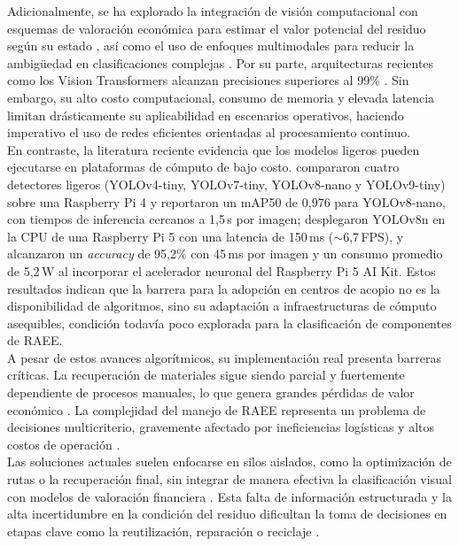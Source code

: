 Adicionalmente, se ha explorado la integración de visión computacional con esquemas de valoración económica para estimar el valor potencial del residuo según su estado \cite{joshiSustainableEWasteManagement2024}, así como el uso de enfoques multimodales para reducir la ambigüedad en clasificaciones complejas \cite{obayemiAutomatedWEEESortation2025a}. Por su parte, arquitecturas recientes como los Vision Transformers alcanzan precisiones superiores al 99\% \cite{chauhanViT4WasteVisionTransformerBased2025}. Sin embargo, su alto costo computacional, consumo de memoria y elevada latencia limitan drásticamente su aplicabilidad en escenarios operativos, haciendo imperativo el uso de redes eficientes orientadas al procesamiento continuo.\\

En contraste, la literatura reciente evidencia que los modelos ligeros pueden ejecutarse en plataformas de cómputo de bajo costo. \cite{castrobelloConvolutionalNeuralNetwork2025} compararon cuatro detectores ligeros (YOLOv4-tiny, YOLOv7-tiny, YOLOv8-nano y YOLOv9-tiny) sobre una Raspberry Pi 4 y reportaron un mAP50 de 0{,}976 para YOLOv8-nano, con tiempos de inferencia cercanos a 1{,}5\,s por imagen; \cite{daoDesignImplementationRealTime2026} desplegaron YOLOv8n en la CPU de una Raspberry Pi 5 con una latencia de 150\,ms ($\sim$6{,}7\,FPS), y \cite{mutarAIBasedModelHome2026} alcanzaron un \textit{accuracy} de 95{,}2\% con 45\,ms por imagen y un consumo promedio de 5{,}2\,W al incorporar el acelerador neuronal del Raspberry Pi 5 AI Kit. Estos resultados indican que la barrera para la adopción en centros de acopio no es la disponibilidad de algoritmos, sino su adaptación a infraestructuras de cómputo asequibles, condición todavía poco explorada para la clasificación de componentes de RAEE.\\

A pesar de estos avances algorítmicos, su implementación real presenta barreras críticas. La recuperación de materiales sigue siendo parcial y fuertemente dependiente de procesos manuales, lo que genera grandes pérdidas de valor económico \cite{oliveiranetoCriticalBarriersMaterial2025}. La complejidad del manejo de RAEE representa un problema de decisiones multicriterio, gravemente afectado por ineficiencias logísticas y altos costos de operación \cite{seikhIdentifyingSustainableStrategies2024, oliveiranetoArtificialIntelligencebasedOptimization2025}.\\

Las soluciones actuales suelen enfocarse en silos aislados, como la optimización de rutas o la recuperación final, sin integrar de manera efectiva la clasificación visual con modelos de valoración financiera \cite{simaeiAIbasedDecisionSupport2024}. Esta falta de información estructurada y la alta incertidumbre en la condición del residuo dificultan la toma de decisiones en etapas clave como la reutilización, reparación o reciclaje \cite{anandhMultiobjectiveMetaheuristicsOptimize2024}.\\

